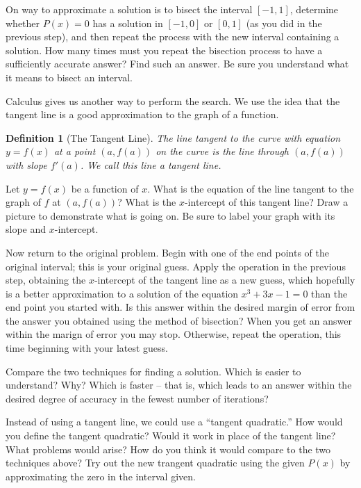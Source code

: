 \documentclass
[justified,nohyper]
{tufte-handout}
\theoremstyle{mydef}
\newtheorem{definition}{Definition}
\begin{document}
On way to approximate a solution is to bisect the interval $[-1,1]$, determine whether $P(x)=0$ has a solution in $[-1,0]$ or $[0,1]$ (as you did in the previous step), and then repeat the process with the new interval containing a solution. How many times must you repeat the bisection process to have a sufficiently accurate answer? Find such an answer. Be sure you understand what it means to bisect an interval.

Calculus gives us another way to perform the search. We use the idea that the tangent line is a good approximation to the graph of a function.

\begin{definition}[The Tangent Line]
The line tangent to the curve with equation $y=f(x)$ at a point $\left(a,f(a)\right)$ on the curve is the line through $\left(a,f(a)\right)$ with slope $f'(a)$. We call this line a tangent line.
\end{definition}

Let $y=f(x)$ be a function of $x$. What is the equation of the line tangent to the graph of $f$ at $\left(a,f(a)\right)$? What is the $x$-intercept of this tangent line? Draw a picture to demonstrate what is going on. Be sure to label your graph with its slope and $x$-intercept.

Now return to the original problem. Begin with one of the end points of the original interval; this is your original guess. Apply the operation in the previous step, obtaining the $x$-intercept of the tangent line as a new guess, which hopefully is a better approximation to a solution of the equation $x^3+3x-1=0$ than the end point you started with. Is this answer within the desired margin of error from the answer you obtained using the method of bisection? When you get an answer within the marign of error you may stop. Otherwise, repeat the operation, this time beginning with your latest guess.

Compare the two techniques for finding a solution. Which is easier to understand? Why? Which is faster -- that is, which leads to an answer within the desired degree of accuracy in the fewest number of iterations?

Instead of using a tangent line, we could use a ``tangent quadratic.'' How would you define the tangent quadratic? Would it work in place of the tangent line? What problems would arise? How do you think it would compare to the two techniques above? Try out the new trangent quadratic using the given $P(x)$ by approximating the zero in the interval given.
\end{document}
